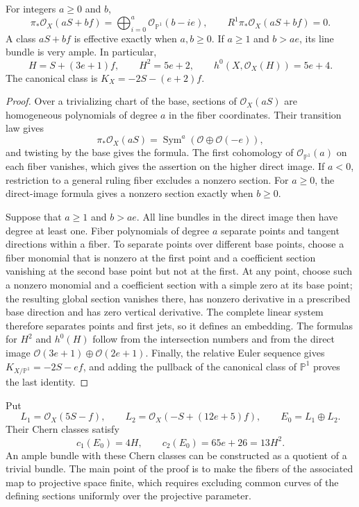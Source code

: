 \begin{lemma}\label{lem:hirzebruch-ruling-sections}
For integers $a\geq0$ and $b$,
\[
 \pi_*\mathcal O_X(aS+bf)=
 \bigoplus_{i=0}^a\mathcal O_{\mathbb P^1}(b-ie),
 \qquad R^1\pi_*\mathcal O_X(aS+bf)=0.
\]
A class $aS+bf$ is effective exactly when $a,b\geq0$. If $a\geq1$ and $b>ae$, its line bundle is very ample. In particular,
\[
 H=S+(3e+1)f,
 \qquad H^2=5e+2,
 \qquad h^0(X,\mathcal O_X(H))=5e+4.
\]
The canonical class is $K_X=-2S-(e+2)f$.
\end{lemma}
\begin{proof}
Over a trivializing chart of the base, sections of $\mathcal O_X(aS)$ are homogeneous polynomials of degree $a$ in the fiber coordinates. Their transition law gives
\[
 \pi_*\mathcal O_X(aS)=
 \operatorname{Sym}^a(\mathcal O\oplus\mathcal O(-e)),
\]
and twisting by the base gives the formula. The first cohomology of $\mathcal O_{\mathbb P^1}(a)$ on each fiber vanishes, which gives the assertion on the higher direct image. If $a<0$, restriction to a general ruling fiber excludes a nonzero section. For $a\geq0$, the direct-image formula gives a nonzero section exactly when $b\geq0$.

Suppose that $a\geq1$ and $b>ae$. All line bundles in the direct image then have degree at least one. Fiber polynomials of degree $a$ separate points and tangent directions within a fiber. To separate points over different base points, choose a fiber monomial that is nonzero at the first point and a coefficient section vanishing at the second base point but not at the first. At any point, choose such a nonzero monomial and a coefficient section with a simple zero at its base point; the resulting global section vanishes there, has nonzero derivative in a prescribed base direction and has zero vertical derivative. The complete linear system therefore separates points and first jets, so it defines an embedding. The formulas for $H^2$ and $h^0(H)$ follow from the intersection numbers and from the direct image $\mathcal O(3e+1)\oplus\mathcal O(2e+1)$. Finally, the relative Euler sequence gives $K_{X/\mathbb P^1}=-2S-ef$, and adding the pullback of the canonical class of $\mathbb P^1$ proves the last identity.
\end{proof}

Put
\[
 L_1=\mathcal O_X(5S-f),\qquad
 L_2=\mathcal O_X(-S+(12e+5)f),\qquad
 E_0=L_1\oplus L_2.
\]
Their Chern classes satisfy
\[
 c_1(E_0)=4H,\qquad c_2(E_0)=65e+26=13H^2.
\]
An ample bundle with these Chern classes can be constructed as a quotient of a trivial bundle. The main point of the proof is to make the fibers of the associated map to projective space finite, which requires excluding common curves of the defining sections uniformly over the projective parameter.


